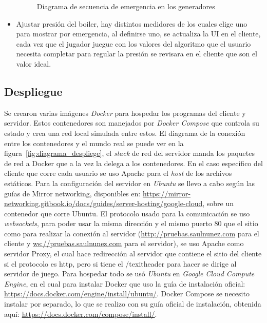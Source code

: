 \begin{itemize}
\begin{figure}[h]
            \caption{Diagrama de secuencia de emergencia en los generadores}
            \label{fig:diagrama_secuencia_generadores}
        \end{figure}
    \item Ajustar presión del boiler, hay distintos medidores de los cuales elige uno para mostrar por emergencia, al definirse uno, se actualiza la UI en el cliente, cada vez que el jugador juegue con los valores del algoritmo que el usuario necesita completar para regular la presión se revisara en el cliente que son el valor ideal.
\end{itemize}

\subsection{Despliegue}
Se crearon varias imágenes \textit{Docker} para hospedar los programas del cliente y servidor. Estos contenedores son manejados por \textit{Docker Compose} que controla su estado y crea una red local simulada entre estos. El diagrama de la conexión entre los contenedores y el mundo real se puede ver en la figura~\ref{fig:diagrama_despliege}, el \textit{stack} de red del servidor manda los paquetes de red a Docker que a la vez la delega a los contenedores.
En el caso especifico del cliente que corre cada usuario se uso Apache para el \textit{host} de los archivos estáticos.
Para la configuración del servidor en \textit{Ubuntu} se llevo a cabo según las guías de Mirror networking, disponibles en: \url{https://mirror-networking.gitbook.io/docs/guides/server-hosting/google-cloud}, sobre un contenedor que corre Ubuntu.
El protocolo usado para la comunicación se uso \textit{websockets}, para poder usar la misma dirección y el mismo puerto 80 que el sitio como para realizar la conexión al servidor (\url{http://pruebas.saulnunez.com} para el cliente y \url{ws://pruebas.saulnunez.com} para el servidor), se uso Apache como servidor Proxy, el cual hace redirección al servidor que contiene el sitio del cliente si el protocolo es http, pero si tiene el /texit{header} para hacer se dirige al servidor de juego.
Para hospedar todo se usó \textit{Ubuntu} en \textit{Google Cloud Compute Engine}, en el cual para instalar Docker que uso la guía de instalación oficial: \url{https://docs.docker.com/engine/install/ubuntu/}. Docker Compose se necesito instalar por separado, lo que se realizo con su guía oficial de instalación, obtenida aquí: \url{https://docs.docker.com/compose/install/}.

